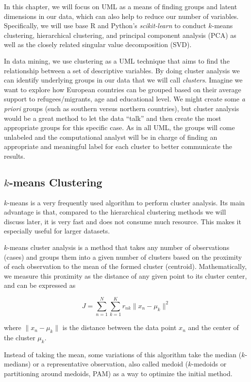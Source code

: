 In this chapter, we will focus on UML as a means of finding groups and
latent dimensions in our data, which can also help to reduce our
number of variables. Specifically, we will use base R and Python's
\emph{scikit-learn} to conduct $k$-means clustering, hierarchical
clustering, and principal component analysis (PCA) as well as the
closely related singular value decomposition (SVD).

In data mining, we use clustering as a UML technique that aims to find
the relationship between a set of descriptive variables. By doing
cluster analysis we can identify underlying groups in our data that we
will call \textit{clusters}. Imagine we want to explore how European
countries can be grouped based on their average support to
refugees/migrants, age and educational level. We might create some
\textit{a priori} groups (such as southern versus northern countries),
but cluster analysis would be a great method to let the data ``talk''
and then create the most appropriate groups for this specific case. As
in all UML, the groups will come unlabeled and the computational
analyst will be in charge of finding an appropriate and meaningful
label for each cluster to better communicate the results.

\subsection{$k$-means Clustering}\label{sec:kmeans}

$k$-means is a very frequently used algorithm to perform cluster
analysis. Its main advantage is that, compared to the hierarchical
clustering methods we will discuss later, it is very fast and does not
consume much resource. This makes it especially useful for larger
datasets.

$k$-means cluster analysis is a method that takes any number of observations (cases) and groups them into a given number of clusters based on the proximity of each observation to the mean of the formed cluster (centroid).  Mathematically, we measure this proximity as the distance of any given point to its cluster center, and can be expressed as

$$J = \sum_{n=1}^{N} \sum_{k=1}^{K} r_{nk} \|x_n - \mu_k\|^2$$

where $\|x_n - \mu_k\|$ is the distance between the data point $x_n$ and the center of the cluster $\mu_k$.

Instead of taking the mean, some variations of this algorithm take the median ($k$-medians) or a representative observation, also called medoid ($k$-medoids or partitioning around medoids, PAM) as a way to optimize the initial method.

